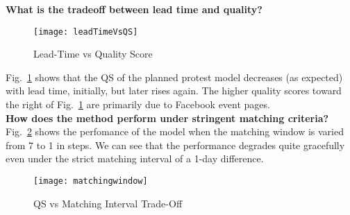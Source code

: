 \noindent
{\bf What is the tradeoff between lead time and quality?}

\begin{figure}[h!]
    \vspace{-1em}
    \centering
    \texttt{[image: leadTimeVsQS]}
    \caption{Lead-Time vs Quality Score}
    \label{fig:leadTimeVsQS}
    \vspace{-1em}
\end{figure}

Fig.~\ref{fig:leadTimeVsQS} shows that the QS of the planned protest model decreases (as expected) with lead time, initially, but
later rises again. The higher quality scores toward the right of Fig.~\ref{fig:leadTimeVsQS} are primarily due to
Facebook event pages.\\

\noindent
{\bf How does the method perform under stringent matching criteria?}
Fig.~\ref{fig:matchinginterval} shows the perfomance of the model when the matching window is varied from 7 to 1 in steps. 
We can see that the performance degrades quite gracefully even under the strict matching interval of a 1-day difference.\\
\begin{figure}[h!]
    \vspace{-1em}
    \centering
  \texttt{[image: matchingwindow]}
    \vspace{-.5em}
  \caption{QS vs Matching Interval Trade-Off}
  \label{fig:matchinginterval}
    \vspace{-1.5em}
\end{figure}

